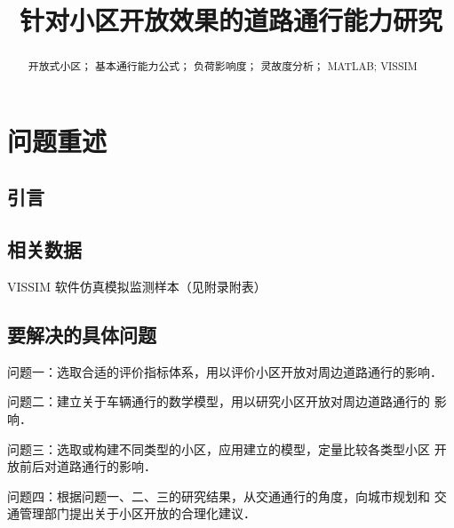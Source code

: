 

\usepackage{ctex}
\usepackage{lipsum}
\usepackage{graphicx}
\usepackage{booktabs,colortbl}
\usepackage{xcolor}
\usepackage{indentfirst}
\usepackage{newtxtext}
\usepackage{lipsum}

\usepackage{paralist}
\let\itemize\compactitem
\let\enditemize\endcompactitem
\let\enumerate\compactenum
\let\endenumerate\endcompactenum
\let\description\compactdesc
\let\enddescription\endcompactdesc

\setlength\abovedisplayskip{5pt}
\setlength\belowdisplayskip{-8pt}
\setlength{\parskip}{0.1em}

\newcommand\wordc[1]{\textbf{#1}}
\renewcommand{\appendixtocname}{附录}
\renewcommand{\appendices}{{\Large {\bf 附录}}}
\newcommand{\headcol}{\rowcolor{tableheadcolor}}

\title{针对小区开放效果的道路通行能力研究}

\date{}

\begin{abstract}


\begin{keywords}
开放式小区； 基本通行能力公式； 负荷影响度； 灵故度分析； MATLAB; VISSIM
\end{keywords}
\end{abstract}
\maketitle
\tableofcontents
\section{问题重述}
\subsection{引言}

\subsection{相关数据}
VISSIM 软件仿真模拟监测样本（见附录附表）
\subsection{要解决的具体问题}
\begin{enumerate}
  \item 问题一：选取合适的评价指标体系，用以评价小区开放对周边道路通行的影响．
  \item 问题二：建立关于车辆通行的数学模型，用以研究小区开放对周边道路通行的
影响．
  \item 问题三：选取或构建不同类型的小区，应用建立的模型，定量比较各类型小区
开放前后对道路通行的影响．
  \item 问题四：根据问题一、二、三的研究结果，从交通通行的角度，向城市规划和
交通管理部门提出关于小区开放的合理化建议．
\end{enumerate}

